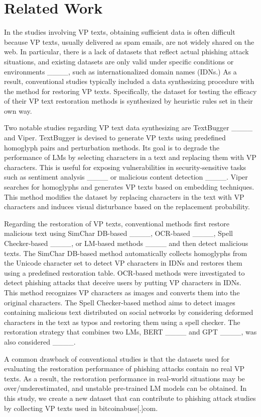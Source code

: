 \section{Related Work}
In the studies involving VP texts, obtaining sufficient data is often difficult because VP texts, usually delivered as spam emails, are not widely shared on the web. In particular, there is a lack of datasets that reflect actual phishing attack situations, and existing datasets are only valid under specific conditions or environments ____, such as internationalized domain names (IDNs.) As a result, conventional studies typically included a data synthesizing procedure with the method for restoring VP texts. Specifically, the dataset for testing the efficacy of their VP text restoration methods is synthesized by heuristic rules set in their own way.

Two notable studies regarding VP text data synthesizing are TextBugger ____ and Viper. TextBugger is devised to generate VP texts using predefined homoglyph pairs and perturbation methods. Its goal is to degrade the performance of LMs by selecting characters in a text and replacing them with VP characters. This is useful for exposing vulnerabilities in security-sensitive tasks such as sentiment analysis ____ or malicious content detection ____. Viper searches for homoglyphs and generates VP texts based on embedding techniques. This method modifies the dataset by replacing characters in the text with VP characters and induces visual disturbance based on the replacement probability.

Regarding the restoration of VP texts, conventional methods first restore malicious text using SimChar DB-based ____, OCR-based ____, Spell Checker-based ____, or LM-based methods ____ and then detect malicious texts. The SimChar DB-based method automatically collects homoglyphs from the Unicode character set to detect VP characters in IDNs and restores them using a predefined restoration table. OCR-based methods were investigated to detect phishing attacks that deceive users by putting VP characters in IDNs. This method recognizes VP characters as images and converts them into the original characters. The Spell Checker-based method aims to detect images containing malicious text distributed on social networks by considering deformed characters in the text as typos and restoring them using a spell checker. The restoration strategy that combines two LMs, BERT ____ and GPT ____, was also considered ____.

A common drawback of conventional studies is that the datasets used for evaluating the restoration performance of phishing attacks contain no real VP texts. As a result, the restoration performance in real-world situations may be over/underestimated, and unstable pre-trained LM models can be obtained. In this study, we create a new dataset that can contribute to phishing attack studies by collecting VP texts used in bitcoinabuse[.]com.

